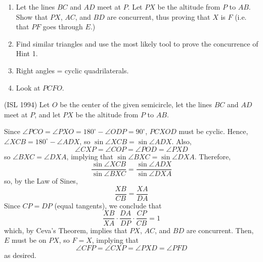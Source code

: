 \begin{sketch}
    \begin{enumerate}
        \item Let the lines $BC$ and $AD$ meet at $P$. Let $PX$ be the altitude from $P$ to $AB$. Show that $PX$, $AC$, and $BD$ are concurrent, thus proving that $X$ is $F$ (i.e. that $PF$ goes through $E$.)

        \item Find similar triangles and use the most likely tool to prove the concurrence of Hint 1.

        \item Right angles = cyclic quadrilaterals.

        \item Look at $PCFO$.
    \end{enumerate}
\end{sketch}

\begin{mdsoln}

    (ISL 1994) Let $O$ be the center of the given semicircle, let the lines $BC$ and $AD$ meet at $P$, and let $PX$ be the altitude from $P$ to $AB$.
    
    Since $\angle PCO=\angle PXO=180^\circ-\angle ODP=90^\circ$, $PCXOD$ must be cyclic. Hence, $\angle XCB=180^\circ-\angle ADX$, so $\sin \angle XCB=\sin \angle ADX$. Also,$$\angle CXP=\angle COP=\angle POD=\angle PXD$$so $\angle BXC=\angle DXA$, implying that $\sin \angle BXC=\sin \angle DXA$. Therefore,$$\frac{\sin\angle XCB}{\sin\angle BXC}=\frac{\sin\angle ADX}{\sin\angle DXA}$$so, by the Law of Sines,$$\frac{XB}{CB}=\frac{XA}{DA}$$Since $CP=DP$ (equal tangents), we conclude that$$\frac{XB}{XA}\cdot \frac{DA}{DP}\cdot \frac{CP}{CB}=1$$which, by Ceva’s Theorem, implies that $PX$, $AC$, and $BD$ are concurrent. Then, $E$ must be on $PX$, so $F=X$, implying that$$\angle CFP=\angle CXP=\angle PXD=\angle PFD$$as desired.    
\end{mdsoln}




